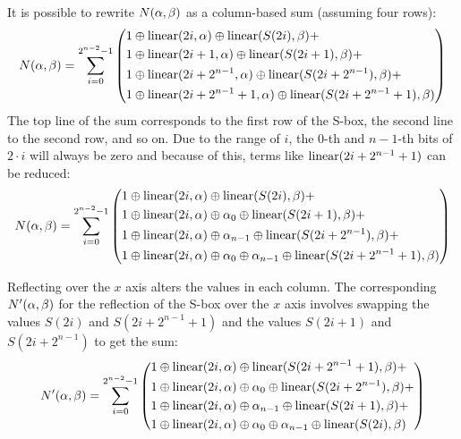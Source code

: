 It is possible to rewrite $N(\alpha,\beta)$ as a column-based sum (assuming four rows):
\[
    N(\alpha,\beta) = \sum_{i=0}^{2^{n-2}-1} \left(
\begin{aligned}
    &1 \oplus \operatorname{linear}(2i,\alpha) \oplus \operatorname{linear}(S(2i),\beta) + \\
    &1 \oplus \operatorname{linear}(2i + 1,\alpha) \oplus \operatorname{linear}(S(2i + 1),\beta) + \\
    &1 \oplus \operatorname{linear}(2i + 2^{n-1},\alpha) \oplus \operatorname{linear}(S(2i + 2^{n-1}),\beta) + \\
    &1 \oplus \operatorname{linear}(2i + 2^{n-1} + 1,\alpha) \oplus \operatorname{linear}(S(2i + 2^{n-1} + 1),\beta)
\end{aligned}
    \right)
\]
The top line of the sum corresponds to the first row of the S-box, the second line to the second row, and so on.
Due to the range of $i$, the $0$-th and $n-1$-th bits of $2 \cdot i$ will always be zero
and because of this, terms like 
$\operatorname{linear}(2i + 2^{n-1} + 1)$ can be reduced:
\[
    N(\alpha,\beta) = \sum_{i=0}^{2^{n-2}-1} \left(
\begin{aligned}
    &1 \oplus \operatorname{linear}(2i,\alpha) \oplus \operatorname{linear}(S(2i),\beta) + \\
    &1 \oplus \operatorname{linear}(2i,\alpha) \oplus \alpha_0 \oplus \operatorname{linear}(S(2i + 1),\beta) + \\
    &1 \oplus \operatorname{linear}(2i,\alpha) \oplus \alpha_{n-1} \oplus \operatorname{linear}(S(2i + 2^{n-1}),\beta) + \\
    &1 \oplus \operatorname{linear}(2i,\alpha) \oplus \alpha_0 \oplus \alpha_{n-1} \oplus \operatorname{linear}(S(2i + 2^{n-1} + 1),\beta)
\end{aligned}
    \right)
\]

Reflecting over the $x$ axis alters the values in each column. 
The corresponding $N'(\alpha,\beta)$ for the reflection of the S-box over the $x$ axis involves swapping the values $S(2i)$ and $S(2i + 2^{n-1} + 1)$ and the values $S(2i+1)$ and $S(2i + 2^{n-1})$ to get the sum: 
\[
    N'(\alpha,\beta) = \sum_{i=0}^{2^{n-2}-1} \left(
\begin{aligned}
    &1 \oplus \operatorname{linear}(2i,\alpha) \oplus \operatorname{linear}(S(2i + 2^{n-1} + 1),\beta) + \\
    &1 \oplus \operatorname{linear}(2i,\alpha) \oplus \alpha_0 \oplus \operatorname{linear}(S(2i + 2^{n-1}),\beta) + \\
    &1 \oplus \operatorname{linear}(2i,\alpha) \oplus \alpha_{n-1} \oplus \operatorname{linear}(S(2i + 1),\beta) + \\
    &1 \oplus \operatorname{linear}(2i,\alpha) \oplus \alpha_0 \oplus \alpha_{n-1} \oplus \operatorname{linear}(S(2i),\beta)
\end{aligned}
    \right)
\]

